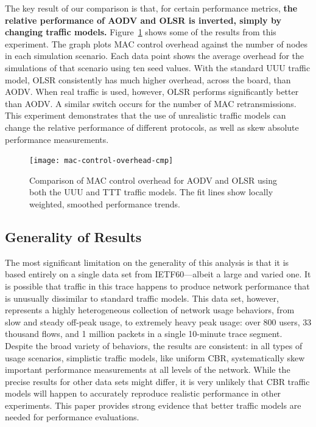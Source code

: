 \documentclass[conference]{IEEEtran}
\newcommand{\caps}[1]{{\small{#1}}}
\begin{document}
The key result of our comparison is that, for certain performance metrics, \textbf{the relative performance of \caps{AODV} and \caps{OLSR} is inverted, simply  by changing traffic models.} Figure~\ref{fig:mac-control-overhead-cmp} shows some of the results from this experiment. The graph plots \caps{MAC} control overhead against the number of nodes in each simulation scenario. Each data point shows the average overhead for the simulations of that scenario using ten seed values. With the standard \caps{UUU} traffic model, \caps{OLSR} consistently has much higher overhead, across the board, than \caps{AODV}. When real traffic is used, however, \caps{OLSR} performs significantly better than \caps{AODV}. A similar switch occurs for the number of \caps{MAC} retransmissions. This experiment demonstrates that the use of unrealistic traffic models can change the relative performance of different protocols, as well as skew absolute performance measurements.

\begin{figure}
\vspace{0.6em}
\begin{centering}
\texttt{[image: mac-control-overhead-cmp]}
\caption{Comparison of {\footnotesize{MAC}} control overhead for {\footnotesize{AODV}} and {\footnotesize{OLSR}} using both the {\footnotesize{UUU}} and {\footnotesize{TTT}} traffic models. The fit lines show locally weighted, smoothed performance trends.}
\label{fig:mac-control-overhead-cmp}
\end{centering}
\vspace{-1.5em}
\end{figure}

\subsection{Generality of Results}


The most significant limitation on the generality of this analysis is that it is based entirely on a single data set from \caps{IETF}60---albeit a large and varied one. It is possible that traffic in this trace happens to produce network performance that is unusually dissimilar to standard traffic models. This data set, however, represents a highly heterogeneous collection of network usage behaviors, from slow and steady off-peak usage, to extremely heavy peak usage: over 800 users, 33 thousand flows, and 1 million packets in a single 10-minute trace segment. Despite the broad variety of behaviors, the results are consistent: in all types of usage scenarios, simplistic traffic models, like uniform \caps{CBR}, systematically skew important performance measurements at all levels of the network. While the precise results for other data sets might differ, it is very unlikely that \caps{CBR} traffic models will happen to accurately reproduce realistic performance in other experiments. This paper provides strong evidence that better traffic models are needed for performance evaluations.
\end{document}
